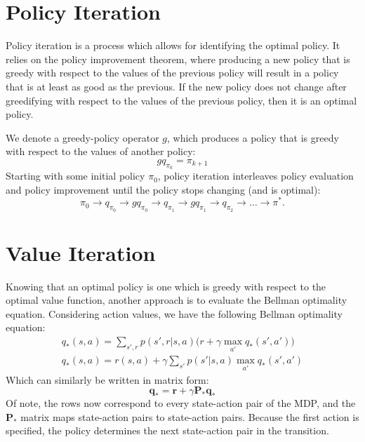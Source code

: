 \documentclass[twoside]{article}
\begin{document}
\section{Policy Iteration}

Policy iteration is a process which allows for identifying the optimal policy. It relies on the policy improvement theorem, where producing a new policy that is greedy with respect to the values of the previous policy will result in a policy that is at least as good as the previous. If the new policy does not change after greedifying with respect to the values of the previous policy, then it is an optimal policy.

We denote a greedy-policy operator $g$, which produces a policy that is greedy with respect to the values of another policy:
\begin{equation*}
    g q_{\pi_{k}} = \pi_{k+1}
\end{equation*}
Starting with some initial policy $\pi_0$, policy iteration interleaves policy evaluation and policy improvement until the policy stops changing (and is optimal):
\begin{equation*}
    \pi_0 \rightarrow q_{\pi_0} \rightarrow g q_{\pi_0} \rightarrow  q_{\pi_1} \rightarrow g q_{\pi_1} \rightarrow q_{\pi_2} \rightarrow \dots \rightarrow \pi^*.
\end{equation*}

\section{Value Iteration}

Knowing that an optimal policy is one which is greedy with respect to the optimal value function, another approach is to evaluate the Bellman optimality equation. Considering action values, we have the following Bellman optimality equation:
\begin{align}
    \nonumber
    q_*(s,a) = \sum_{s',r}{p(s',r|s,a)\big(r + \gamma \max_{a'}{q_*(s',a')}\big)} \\
    \nonumber
    q_*(s,a) = r(s,a) + \gamma \sum_{s'}{p(s'|s,a)\max_{a'}{q_*(s',a')}}
\end{align}
Which can similarly be written in matrix form:
\begin{equation}
    \mathbf{q}_* = \mathbf{r} + \gamma \mathbf{P}_* \mathbf{q}_*
\end{equation}
Of note, the rows now correspond to every state-action pair of the MDP, and the $\mathbf{P}_*$ matrix maps state-action pairs to state-action pairs. Because the first action is specified, the policy determines the next state-action pair in the transition.
\end{document}
